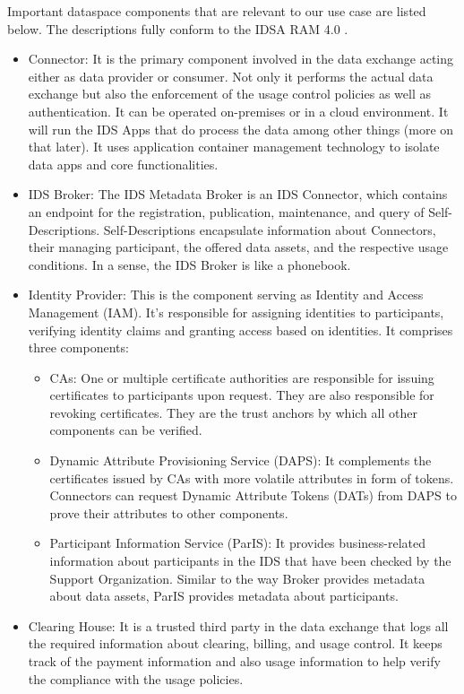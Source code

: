 \documentclass{article}
\begin{document}
Important dataspace components that are relevant to our use case are listed below. The descriptions fully conform to the IDSA RAM 4.0 \cite{otto_ids_2019}.
\begin{itemize}
    \item Connector: It is the primary component involved in the data exchange acting either as data provider or consumer. Not only it performs the actual data exchange but also the enforcement of the usage control policies as well as authentication. It can be operated on-premises or in a cloud environment. It will run the IDS Apps that do process the data among other things (more on that later). It uses application container management technology to isolate data apps and core functionalities.
    \item IDS Broker: The IDS Metadata Broker is an IDS Connector, which contains an endpoint for the registration, publication, maintenance, and query of Self-Descriptions. Self-Descriptions encapsulate information about Connectors, their managing participant, the offered data assets, and the respective usage conditions. In a sense, the IDS Broker is like a phonebook.
    \item Identity Provider: This is the component serving as Identity and Access Management (IAM). It's responsible for assigning identities to participants, verifying identity claims and granting access based on identities. It comprises three components: 
        \begin{itemize}
            \item CAs: One or multiple certificate authorities are responsible for issuing certificates to participants upon request. They are also responsible for revoking certificates. They are the trust anchors by which all other components can be verified.
            \item Dynamic Attribute Provisioning Service (DAPS): It complements the certificates issued by CAs with more volatile attributes in form of tokens. Connectors can request Dynamic Attribute Tokens (DATs) from DAPS to prove their attributes to other components.
            \item Participant Information Service (ParIS):  It provides business-related information about participants in the IDS that have been checked by the Support Organization. Similar to the way Broker provides metadata about data assets, ParIS provides metadata about participants.
        \end{itemize}
    \item Clearing House: It is a trusted third party in the data exchange that logs all the required information about clearing, billing, and usage control. It keeps track of the payment information and also usage information to help verify the compliance with the usage policies.

\end{itemize}
\end{document}

